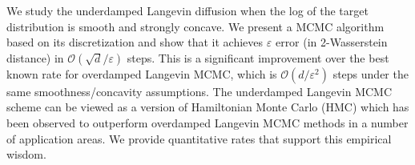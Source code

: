 We study the underdamped Langevin diffusion when the log of the target distribution is smooth and strongly concave. We present a MCMC algorithm based on its discretization and show that it achieves $\varepsilon$ error (in 2-Wasserstein distance) in $\mathcal{O}(\sqrt{d}/\varepsilon)$ steps. This is a significant improvement over the best known rate for overdamped Langevin MCMC, which is $\mathcal{O}(d/\varepsilon^2)$ steps under the same smoothness/concavity assumptions. The underdamped Langevin MCMC scheme can be viewed as a version of Hamiltonian Monte Carlo (HMC) which has been observed to outperform overdamped Langevin MCMC methods in a number of application areas. We provide quantitative rates that support this empirical wisdom.